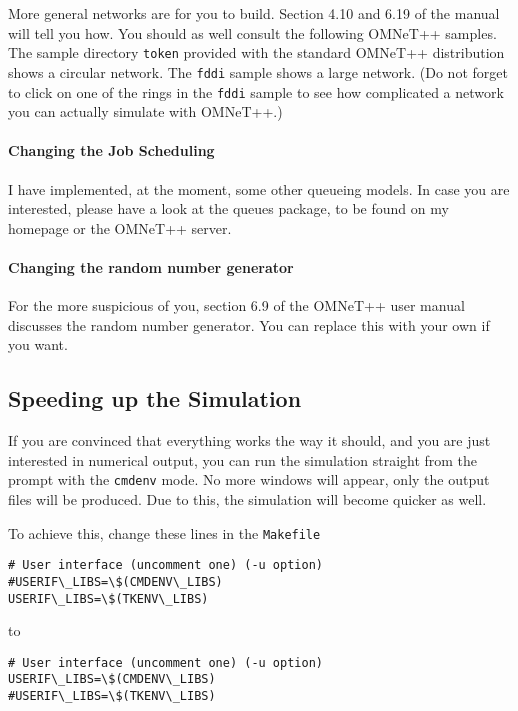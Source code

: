 \documentclass[a4paper]{article}
\begin{document}
More general networks are for you to build. Section 4.10 and 6.19 of
the manual will tell you how. You should as well consult the following
OMNeT++ samples. The sample directory \texttt{token} provided with the
standard OMNeT++ distribution shows a circular network. The
\texttt{fddi} sample shows a large network. (Do not forget to click on
one of the rings in the \texttt{fddi} sample to see how complicated
a network you can actually simulate with OMNeT++.)


\paragraph{Changing the Job Scheduling}
\label{sec:chang-job-sched}
I have implemented, at the moment, some other queueing models. In case you are
interested, please have a look at the queues package, to be found on
my homepage or the OMNeT++ server.

\paragraph{Changing the random number generator}
\label{sec:chang-rand-numb}
For the more suspicious of you, section 6.9 of the OMNeT++
user manual discusses the random number generator. You can replace
this with your own if you want.


\subsection{Speeding up the Simulation}
\label{sec:speed-up-simul}
If you are convinced that everything works the way it should, and you
are just interested in numerical output, you can run the simulation
straight from the prompt with the \texttt{cmdenv} mode. No more
windows will appear, only the output files will be produced. Due to
this, the simulation will become quicker as well.

To achieve this, change these lines in the  \texttt{Makefile}

\begin{verbatim}
# User interface (uncomment one) (-u option)
#USERIF\_LIBS=\$(CMDENV\_LIBS)
USERIF\_LIBS=\$(TKENV\_LIBS)
\end{verbatim}

to

\begin{verbatim}
# User interface (uncomment one) (-u option)
USERIF\_LIBS=\$(CMDENV\_LIBS)
#USERIF\_LIBS=\$(TKENV\_LIBS)
\end{verbatim}
\end{document}
